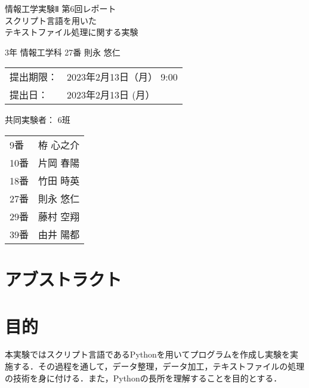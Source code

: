\documentclass[uplatex,dvipdfmx,12pt]{jsarticle}
\begin{document}
\begin{titlepage}
\begin{center}
\begin{huge}
情報工学実験Ⅱ 第6回レポート \\ \vspace{1em}
スクリプト言語を用いた\\テキストファイル処理に関する実験
\end{huge}
\end{center}
\vspace{3em}
\begin{flushright}
\begin{LARGE}
\thispagestyle{empty}
3年 情報工学科 27番  則永 悠仁\\ \vspace{1em}

\end{LARGE}
\end{flushright}

\vspace{6em}

\begin{Large}
\begin{tabular}{ll}
提出期限： & 2023年2月13日（月） 9:00 \\
提出日： & 2023年2月13日 (月）
\end{tabular}
\vspace{2em}

共同実験者： 6班

\vspace{1em}
\begin{tabular}{ll}
9番 & 栫 心之介 \\
10番 & 片岡 春陽 \\
18番 & 竹田 時英\\
27番 & 則永 悠仁 \\
29番 & 藤村 空翔 \\
39番 & 由井 陽都 \\
\end{tabular}
\end{Large}
\end{titlepage}

\newpage
\section*{アブストラクト}

\newpage
\section{目的}
本実験ではスクリプト言語であるPythonを用いてプログラムを作成し実験を実施する．その過程を通して，データ整理，データ加工，テキストファイルの処理の技術を身に付ける．また，Pythonの長所を理解することを目的とする．
\end{document}
